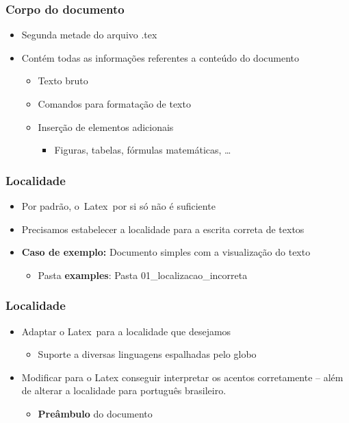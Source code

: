\begin{frame} \frametitle{Corpo do documento}
\begin{itemize}
	\item Segunda metade do arquivo .tex
	\item Contém todas as informações referentes a conteúdo do documento
	\begin{itemize}
		\item Texto bruto
		\item Comandos para formatação de texto
		\item Inserção de elementos adicionais
		\begin{itemize}
			\item Figuras, tabelas, fórmulas matemáticas, \ldots
		\end{itemize}
	\end{itemize}
\end{itemize}
\end{frame}

\begin{frame} \frametitle{Localidade}
\begin{itemize}
	\item Por padrão, o~Latex~por si só não é suficiente
	\item Precisamos estabelecer a localidade para a escrita correta de textos
	\item \textbf{Caso de exemplo:} Documento simples com a visualização do texto 
	\begin{itemize}
		\item Pasta \textbf{examples}: Pasta 01\_localizacao\_incorreta
	\end{itemize}
\end{itemize}
\end{frame}

\begin{frame} \frametitle{Localidade}
\begin{itemize}
	\item Adaptar o Latex~para a localidade que desejamos
	\begin{itemize}
		\item Suporte a diversas linguagens espalhadas pelo globo
	\end{itemize}
	\item Modificar para o Latex conseguir interpretar os acentos corretamente -- além de alterar a localidade para português brasileiro.
	\begin{itemize}
		\item \textbf{Preâmbulo} do documento
	\end{itemize}
\end{itemize}
\end{frame}

